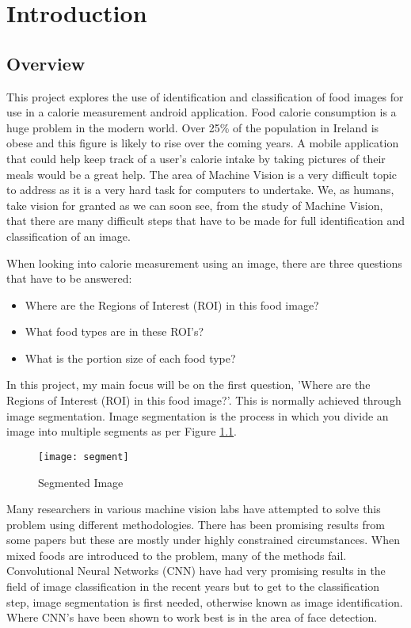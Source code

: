 \chapter{Introduction}
\label{intro}

\section{Overview}
This project explores the use of identification and classification of food images for use in a calorie measurement android application.
Food calorie consumption is a huge problem in the modern world.
Over 25\% of the population in Ireland is obese and this figure is likely to rise over the coming years.
A mobile application that could help keep track of a user's calorie intake by taking pictures of their meals would be a great help.
The area of Machine Vision is a very difficult topic to address as it is a very hard task for computers to undertake.
We, as humans, take vision for granted as we can soon see, from the study of Machine Vision, that there are many difficult steps that have to be made for full identification and classification of an image.

When looking into calorie measurement using an image, there are three questions that have to be answered:
\begin{itemize}
\item{Where are the Regions of Interest (ROI) in this food image?}
\item{What food types are in these ROI's?}
\item{What is the portion size of each food type?}
\end{itemize}
In this project, my main focus will be on the first question, 'Where are the
Regions of Interest (ROI) in this food image?'. This is normally achieved
through image segmentation. Image segmentation is the process in which you
divide an image into multiple segments as per Figure \ref{fig:imageSeg}.

\begin{figure}
	\texttt{[image: segment]}
	\caption{Segmented Image}
	\label{fig:imageSeg}
\end{figure}

Many researchers in various machine vision labs have attempted to solve this
problem using different methodologies.
There has been promising results from some papers but these are mostly under highly constrained circumstances.
When mixed foods are introduced to the problem, many of the methods fail.
Convolutional Neural Networks (CNN) have had very promising results in the field of image classification in the recent years but to get to the classification step, image segmentation is first needed, otherwise known as image identification.
Where CNN's have been shown to work best is in the area of face detection.

